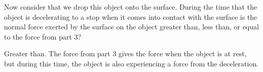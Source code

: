 Now consider that we drop this object onto the surface. During the time that the object is decelerating to a stop when it comes into contact with the surface is the normal force exerted by the surface on the object greater than, less than, or equal to the force from part 3?

\begin{solution}
    Greater than. The force from part 3 gives the force when the object is at rest, but during this time, the object is also experiencing a force from the deceleration.
\end{solution}
